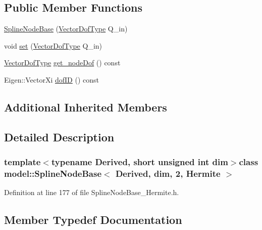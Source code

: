 \subsection*{Public Member Functions}
\begin{DoxyCompactItemize}
\item 
\hyperlink{classmodel_1_1_spline_node_base_3_01_derived_00_01dim_00_012_00_01_hermite_01_4_ae3bcbf88f11d32933ef2afd9477f356e}{Spline\+Node\+Base} (\hyperlink{classmodel_1_1_spline_node_base_3_01_derived_00_01dim_00_012_00_01_hermite_01_4_ae84e26005498ece8bb33e3fed1a61d55}{Vector\+Dof\+Type} Q\+\_\+in)
\item 
void \hyperlink{classmodel_1_1_spline_node_base_3_01_derived_00_01dim_00_012_00_01_hermite_01_4_a4416944b4024971b9a6ca4a3e400ea60}{set} (\hyperlink{classmodel_1_1_spline_node_base_3_01_derived_00_01dim_00_012_00_01_hermite_01_4_ae84e26005498ece8bb33e3fed1a61d55}{Vector\+Dof\+Type} Q\+\_\+in)
\item 
\hyperlink{classmodel_1_1_spline_node_base_3_01_derived_00_01dim_00_012_00_01_hermite_01_4_ae84e26005498ece8bb33e3fed1a61d55}{Vector\+Dof\+Type} \hyperlink{classmodel_1_1_spline_node_base_3_01_derived_00_01dim_00_012_00_01_hermite_01_4_a13b2c8e5cad6ab037f23ba06748ab639}{get\+\_\+node\+Dof} () const 
\item 
Eigen\+::\+Vector\+Xi \hyperlink{classmodel_1_1_spline_node_base_3_01_derived_00_01dim_00_012_00_01_hermite_01_4_a5ebb6b1017b5353426f54ceb30086cfa}{dof\+I\+D} () const 
\end{DoxyCompactItemize}
\subsection*{Additional Inherited Members}


\subsection{Detailed Description}
\subsubsection*{template$<$typename Derived, short unsigned int dim$>$class model\+::\+Spline\+Node\+Base$<$ Derived, dim, 2, Hermite $>$}



Definition at line 177 of file Spline\+Node\+Base\+\_\+\+Hermite.\+h.



\subsection{Member Typedef Documentation}
\hypertarget{classmodel_1_1_spline_node_base_3_01_derived_00_01dim_00_012_00_01_hermite_01_4_ae8bedfd4860470c1c8c1ace633f29c2b}{}
